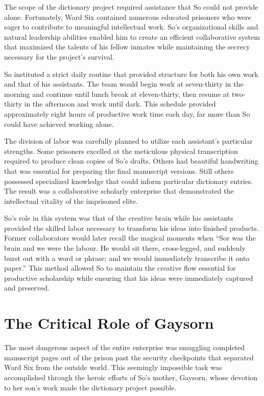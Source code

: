 \documentclass[
  Letterpaper,
]{scrbook}
\begin{document}
The scope of the dictionary project required assistance that So could
not provide alone. Fortunately, Ward Six contained numerous educated
prisoners who were eager to contribute to meaningful intellectual work.
So's organizational skills and natural leadership abilities enabled him
to create an efficient collaborative system that maximized the talents
of his fellow inmates while maintaining the secrecy necessary for the
project's survival.

So instituted a strict daily routine that provided structure for both
his own work and that of his assistants. The team would begin work at
seven-thirty in the morning and continue until lunch break at
eleven-thirty, then resume at two-thirty in the afternoon and work until
dark. This schedule provided approximately eight hours of productive
work time each day, far more than So could have achieved working alone.

The division of labor was carefully planned to utilize each assistant's
particular strengths. Some prisoners excelled at the meticulous physical
transcription required to produce clean copies of So's drafts. Others
had beautiful handwriting that was essential for preparing the final
manuscript versions. Still others possessed specialized knowledge that
could inform particular dictionary entries. The result was a
collaborative scholarly enterprise that demonstrated the intellectual
vitality of the imprisoned elite.

So's role in this system was that of the creative brain while his
assistants provided the skilled labor necessary to transform his ideas
into finished products. Former collaborators would later recall the
magical moments when ``Sor was the brain and we were the labour. He
would sit there, cross-legged, and suddenly burst out with a word or
phrase; and we would immediately transcribe it onto paper.'' This method
allowed So to maintain the creative flow essential for productive
scholarship while ensuring that his ideas were immediately captured and
preserved.

\section{The Critical Role of
Gaysorn}\label{the-critical-role-of-gaysorn}

The most dangerous aspect of the entire enterprise was smuggling
completed manuscript pages out of the prison past the security
checkpoints that separated Ward Six from the outside world. This
seemingly impossible task was accomplished through the heroic efforts of
So's mother, Gaysorn, whose devotion to her son's work made the
dictionary project possible.
\end{document}
